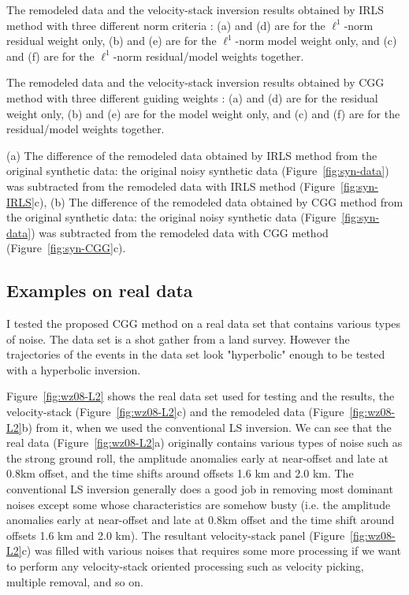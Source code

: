 {The remodeled data and the velocity-stack inversion results obtained by IRLS method 
with three different norm criteria : (a) and (d) are for the $\ell^1$-norm residual weight only,
(b) and (e) are for the $\ell^1$-norm model weight only,
and (c) and (f) are for the $\ell^1$-norm residual/model weights together.}

{The remodeled data and the velocity-stack inversion results obtained by CGG method 
with three different guiding weights : (a) and (d) are for the residual weight only, 
(b) and (e) are for the model weight only,
and (c) and (f) are for the residual/model weights together.}

{ (a) The difference of the remodeled data obtained by IRLS method from the original synthetic data: 
the original noisy synthetic data (Figure~\protect\ref{fig:syn-data}) was subtracted 
 from the remodeled data with IRLS method (Figure~\protect\ref{fig:syn-IRLS}c),
(b) The difference of the remodeled data obtained by CGG method from the original synthetic data: 
the original noisy synthetic data (Figure~\protect\ref{fig:syn-data}) was subtracted 
 from the remodeled data with CGG method (Figure~\protect\ref{fig:syn-CGG}c).
}

\subsection{Examples on real data}

I tested the proposed CGG method on a real data set
that contains various types of noise.  
The data set is a shot gather from a land survey. 
However the trajectories of the events in the data set
look "hyperbolic" enough to be tested with a hyperbolic inversion.

Figure~\ref{fig:wz08-L2} shows the real data set used for testing
and the results, the velocity-stack (Figure~\ref{fig:wz08-L2}c) and 
the remodeled data (Figure~\ref{fig:wz08-L2}b) from it, when we used the conventional LS inversion. 
We can see that the real data (Figure~\ref{fig:wz08-L2}a) originally contains 
various types of noise such as the strong ground roll, 
the amplitude anomalies early at near-offset and 
late at 0.8km offset, 
and the time shifts around offsets 1.6 km and 2.0 km.
The conventional LS inversion generally does a good job in removing most dominant noises
except some whose characteristics are somehow busty (i.e. the amplitude anomalies early at near-offset and 
late at 0.8km offset and the time shift around offsets 1.6 km and 2.0 km).
The resultant velocity-stack panel (Figure~\ref{fig:wz08-L2}c) was filled with various noises that
requires some more processing if we want to perform any velocity-stack oriented processing 
such as velocity picking, multiple removal, and so on.

